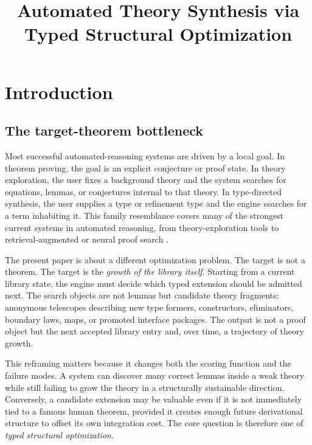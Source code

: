\documentclass[pdflatex,sn-mathphys,Numbered]{sn-jnl}
\title[Automated Theory Synthesis]{Automated Theory Synthesis via Typed Structural Optimization}
\author*[1]{\fnm{Halvor} \sur{Lande}}\email{hsl@awc.no}
\affil*[1]{\orgname{Draft affiliation to be supplied}, \orgaddress{\country{Norway}}}
\theoremstyle{thmstyleone}
\theoremstyle{thmstylethree}
\theoremstyle{thmstyletwo}
\begin{document}
\maketitle

\section{Introduction}\label{sec:intro}

\subsection{The target-theorem bottleneck}

Most successful automated-reasoning systems are driven by a local goal. In theorem proving, the goal is an explicit conjecture or proof state. In theory exploration, the user fixes a background theory and the system searches for equations, lemmas, or conjectures internal to that theory. In type-directed synthesis, the user supplies a type or refinement type and the engine searches for a term inhabiting it. This family resemblance covers many of the strongest current systems in automated reasoning, from theory-exploration tools to retrieval-augmented or neural proof search \cite{quickspec,isacosy,hipster,synquid,leandojo,alphageometry}.

The present paper is about a different optimization problem. The target is not a theorem. The target is the \emph{growth of the library itself}. Starting from a current library state, the engine must decide which typed extension should be admitted next. The search objects are not lemmas but candidate theory fragments: anonymous telescopes describing new type formers, constructors, eliminators, boundary laws, maps, or promoted interface packages. The output is not a proof object but the next accepted library entry and, over time, a trajectory of theory growth.

This reframing matters because it changes both the scoring function and the failure modes. A system can discover many correct lemmas inside a weak theory while still failing to grow the theory in a structurally sustainable direction. Conversely, a candidate extension may be valuable even if it is not immediately tied to a famous human theorem, provided it creates enough future derivational structure to offset its own integration cost. The core question is therefore one of \emph{typed structural optimization}.
\end{document}
